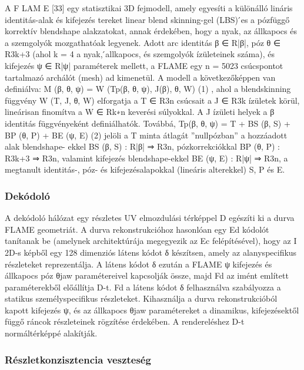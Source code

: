 \documentclass[12pt,a4]{article}
\begin{document}
	 \begin{mdframed}
	 	A F LAM E [33] egy statisztikai 3D fejmodell, amely egyesíti a különálló
	 	lináris identitás-alak és kifejezés tereket linear blend skinning-gel (LBS)
	 	́es a pózfüggő korrektív blendshape alakzatokat, annak érdekében, hogy
	 	a nyak, az állkapocs és a szemgolyók mozgathatóak legyenek.
	 	Adott arc identitás β ∈ R|β|, póz θ ∈ R3k+3 (ahol k = 4 a nyak,
	 	́allkapocs, és szemgolyók ízületeinek száma), és kifejezés ψ ∈ R|ψ|
	 	paraméterek mellett, a FLAME egy n = 5023 csúcspontot tartalmazó
	 	archálót (mesh) ad kimenetül.
	 	A modell a következőképpen van definiálva:
	 	M (β, θ, ψ) = W (Tp(β, θ, ψ), J(β), θ, W) (1)
	 	,
	 	ahol a blendskinning függvény W (T, J, θ, W) elforgatja a T ∈ R3n
	 	csúcsait a J ∈ R3k ízületek körül, lineárisan finomítva a W ∈ Rk∗n
	 	keverési súlyokkal.
	 	A J ízületi helyek a β identitás függvényeként definiálhatók.
	 	Továbbá,
	 	Tp(β, θ, ψ) = T + BS (β, S) + BP (θ, P) + BE (ψ, E) (2)
	 	jelöli a T minta átlagát ”nullpózban” a hozzáadott alak blendshape-
	 	ekkel BS (β, S) : R|β| ⇒ R3n, pózkorrekciókkal BP (θ, P) : R3k+3 ⇒ R3n,
	 	valamint kifejezés blendshape-ekkel BE (ψ, E) : R|ψ| ⇒ R3n, a megtanult
	 	identitás-, póz- és kifejezésalapokkal (lineáris alterekkel) S, P és E.
	 \end{mdframed}
 
 	 \subsubsection{Dekódoló}
 	 
 	 A dekódoló hálózat egy részletes UV elmozdulási térképpel D egészíti
 	 ki a durva FLAME geometriát. A durva rekonstrukcióhoz hasonlóan
 	 egy Ed kódolót tanítanak be (amelynek architektúrája megegyezik az Ec
 	 felépítésével), hogy az I 2D-s képből egy 128 dimenziós látens kódot δ
 	 készítsen, amely az alanyspecifikus részleteket reprezentálja. A látens kódot δ
 	 ezután a FLAME ψ kifejezés és állkapocs póz θjaw paramétereivel kapcsolják
 	össze, majd Fd az imént említett paraméterekből előállítja D-t.
 	 Fd a látens kódot δ felhasználva szabályozza a statikus személyspecifikus
 	 részleteket. Kihasználja a durva rekonstrukcióból kapott kifejezés ψ, és
 	 az állkapocs θjaw paramétereket a dinamikus, kifejezésektől függő ráncok részleteinek rögzítése érdekében. A rendereléshez D-t normáltérképpé
 	 alakítják.
 	 
 	 \subsubsection{Részletkonzisztencia veszteség}
	 
\end{document}
